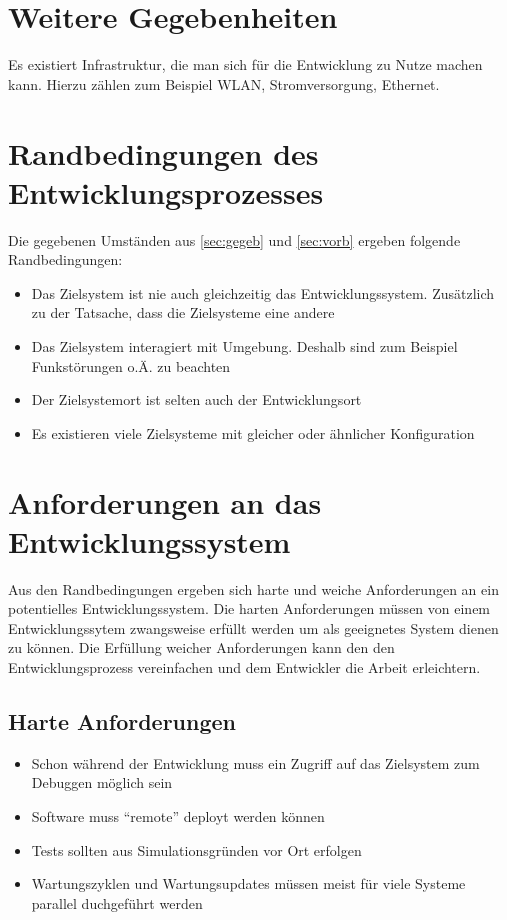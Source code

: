 \section{Weitere Gegebenheiten}\label{sec:gegeb}
Es existiert Infrastruktur, die man sich für die Entwicklung zu Nutze machen
kann. Hierzu zählen zum Beispiel WLAN, Stromversorgung, Ethernet.

\section{Randbedingungen des Entwicklungsprozesses}
Die gegebenen Umständen aus \autoref{sec:gegeb} und \autoref{sec:vorb} ergeben
folgende Randbedingungen:
\begin{itemize}
  \item Das Zielsystem ist nie auch gleichzeitig das Entwicklungssystem.
  Zusätzlich zu der Tatsache, dass die Zielsysteme eine andere
  \item Das Zielsystem interagiert mit Umgebung. Deshalb sind zum Beispiel
  Funkstörungen o.Ä. zu beachten
  \item Der Zielsystemort ist selten auch der Entwicklungsort
  \item Es existieren viele Zielsysteme mit gleicher oder ähnlicher
  Konfiguration
\end{itemize}

\section{Anforderungen an das Entwicklungssystem}
Aus den Randbedingungen ergeben sich harte und weiche Anforderungen an ein
potentielles Entwicklungssystem. Die harten Anforderungen müssen von einem
Entwicklungssytem zwangsweise erfüllt werden um als geeignetes System dienen zu
können. Die Erfüllung weicher Anforderungen kann den den
Entwicklungsprozess vereinfachen und dem Entwickler die Arbeit erleichtern.
\subsection{Harte Anforderungen}
\begin{itemize}
  \item Schon während der Entwicklung muss ein Zugriff auf das Zielsystem zum
  Debuggen möglich sein
  \item Software muss "`remote"' deployt werden können
  \item Tests sollten aus Simulationsgründen vor Ort erfolgen
  \item Wartungszyklen und Wartungsupdates müssen meist für viele Systeme
  parallel duchgeführt werden
\end{itemize}
